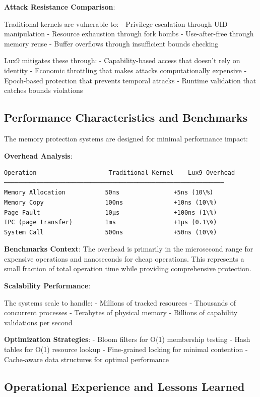 \documentclass[11pt,letterpaper]{article}
\begin{document}
\textbf{Attack Resistance Comparison}:

Traditional kernels are vulnerable to:
- Privilege escalation through UID manipulation
- Resource exhaustion through fork bombs
- Use-after-free through memory reuse
- Buffer overflows through insufficient bounds checking

Lux9 mitigates these through:
- Capability-based access that doesn't rely on identity
- Economic throttling that makes attacks computationally expensive
- Epoch-based protection that prevents temporal attacks
- Runtime validation that catches bounds violations

\subsection{Performance Characteristics and Benchmarks}

The memory protection systems are designed for minimal performance impact:

\textbf{Overhead Analysis}:

\begin{lstlisting}
Operation                    Traditional Kernel    Lux9 Overhead
─────────────────────────────────────────────────────────────
Memory Allocation           50ns               +5ns (10\%)
Memory Copy                 100ns              +10ns (10\%)
Page Fault                  10μs               +100ns (1\%)
IPC (page transfer)         1ms                +1μs (0.1\%)
System Call                 500ns              +50ns (10\%)
\end{lstlisting}

\textbf{Benchmarks Context}: The overhead is primarily in the microsecond range for expensive operations and nanoseconds for cheap operations. This represents a small fraction of total operation time while providing comprehensive protection.

\textbf{Scalability Performance}:

The systems scale to handle:
- Millions of tracked resources
- Thousands of concurrent processes
- Terabytes of physical memory
- Billions of capability validations per second

\textbf{Optimization Strategies}:
- Bloom filters for O(1) membership testing
- Hash tables for O(1) resource lookup
- Fine-grained locking for minimal contention
- Cache-aware data structures for optimal performance

\subsection{Operational Experience and Lessons Learned}
\end{document}
